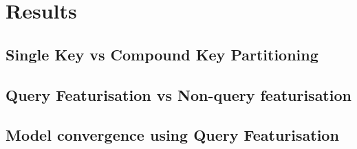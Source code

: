 \chapter{Results}

\section{Single Key vs Compound Key Partitioning}

\section{Query Featurisation vs Non-query featurisation}

\section{Model convergence using Query Featurisation}
